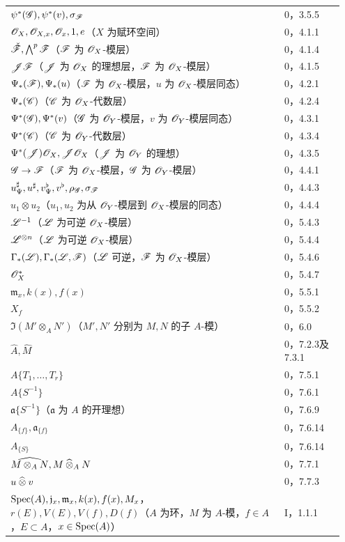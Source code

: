 \begin{longtable}{@{}p{0.78\linewidth}p{0.17\linewidth}@{}}
$\psi^*(\mathscr G),\psi^*(v),\sigma_{\mathscr F}$&0，3.5.5\\
$\mathscr O_X,\mathscr O_{X,x},\mathscr O_x,1,e$（$X$ 为赋环空间）&0，4.1.1\\
$\check{\mathscr F},\bigwedge^p\mathscr F$（$\mathscr F$ 为 $\mathscr O_X$-模层）&0，4.1.4\\
$\mathscr J\mathscr F$（$\mathscr J$ 为 $\mathscr O_X$ 的理想层，$\mathscr F$ 为 $\mathscr O_X$-模层）&0，4.1.5\\
$\Psi_*(\mathscr F),\Psi_*(u)$（$\mathscr F$ 为 $\mathscr O_X$-模层，$u$ 为 $\mathscr O_X$-模层同态）&0，4.2.1\\
$\Psi_*(\mathscr C)$（$\mathscr C$ 为 $\mathscr O_X$-代数层）&0，4.2.4\\
$\Psi^*(\mathscr G),\Psi^*(v)$（$\mathscr G$ 为 $\mathscr O_Y$-模层，$v$ 为 $\mathscr O_Y$-模层同态）&0，4.3.1\\
$\Psi^*(\mathscr C)$（$\mathscr C$ 为 $\mathscr O_Y$-代数层）&0，4.3.4\\
$\Psi^*(\mathscr J)\mathscr O_X,\mathscr J\mathscr O_X$（$\mathscr J$ 为 $\mathscr O_Y$ 的理想）&0，4.3.5\\
$\mathscr G\to\mathscr F$（$\mathscr F$ 为 $\mathscr O_X$-模层，$\mathscr G$ 为 $\mathscr O_Y$-模层）&0，4.4.1\\
$u^\sharp_\Psi,u^\sharp,v^\flat_\Psi,v^\flat,\rho_{\mathscr G},\sigma_{\mathscr F}$&0，4.4.3\\
$u_1\otimes u_2$（$u_1,u_2$ 为从 $\mathscr O_Y$-模层到 $\mathscr O_X$-模层的同态）&0，4.4.4\\
$\mathscr L^{-1}$（$\mathscr L$ 为可逆 $\mathscr O_X$-模层）&0，5.4.3\\
$\mathscr L^{\otimes n}$（$\mathscr L$ 为可逆 $\mathscr O_X$-模层）&0，5.4.4\\
$\Gamma_*(\mathscr L),\Gamma_*(\mathscr L,\mathscr F)$（$\mathscr L$ 可逆，$\mathscr F$ 为 $\mathscr O_X$-模层）&0，5.4.6\\
$\mathscr O_X^*$&0，5.4.7\\
$\mathfrak m_x,k(x),f(x)$&0，5.5.1\\
$X_f$&0，5.5.2\\
$\Im(M'\otimes_A N')$（$M',N'$ 分别为 $M,N$ 的子 $A$-模）&0，6.0\\
$\widehat A,\widehat M$&0，7.2.3及7.3.1\\
$A\{T_1,\ldots,T_r\}$&0，7.5.1\\
$A\{S^{-1}\}$&0，7.6.1\\
$\mathfrak a\{S^{-1}\}$（$\mathfrak a$ 为 $A$ 的开理想）&0，7.6.9\\
$A_{\{f\}},\mathfrak a_{\{f\}}$&0，7.6.14\\
$A_{\{S\}}$&0，7.6.14\\
$\widehat{M\otimes_A N},M\mathbin{\widehat{\otimes}}_A N$&0，7.7.1\\
$u\mathbin{\widehat{\otimes}} v$&0，7.7.3\\
\midrule
$\operatorname{Spec}(A),\mathfrak j_x,\mathfrak m_x,k(x),f(x),M_x$，$r(E),V(E),V(f),D(f)$（$A$ 为环，$M$ 为 $A$-模，$f\in A$，$E\subset A$，$x\in\operatorname{Spec}(A)$）&I，1.1.1\\

\end{longtable}
